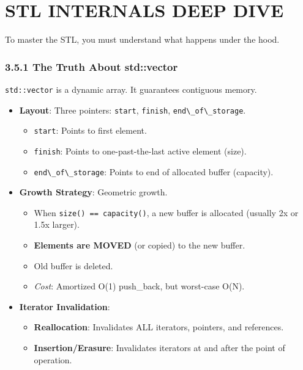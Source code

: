 \hypertarget{stl-internals-deep-dive}{%
\chapter{STL INTERNALS DEEP DIVE}\label{stl-internals-deep-dive}}

To master the STL, you must understand what happens under the hood.

\hypertarget{the-truth-about-stdvector}{%
\subsection{3.5.1 The Truth About
std::vector}\label{the-truth-about-stdvector}}

\passthrough{\lstinline!std::vector!} is a dynamic array. It guarantees
contiguous memory.

\begin{itemize}
\tightlist
\item
  \textbf{Layout}: Three pointers: \passthrough{\lstinline!start!},
  \passthrough{\lstinline!finish!},
  \passthrough{\lstinline!end\_of\_storage!}.

  \begin{itemize}
  \tightlist
  \item
    \passthrough{\lstinline!start!}: Points to first element.
  \item
    \passthrough{\lstinline!finish!}: Points to one-past-the-last active
    element (size).
  \item
    \passthrough{\lstinline!end\_of\_storage!}: Points to end of
    allocated buffer (capacity).
  \end{itemize}
\item
  \textbf{Growth Strategy}: Geometric growth.

  \begin{itemize}
  \tightlist
  \item
    When \passthrough{\lstinline!size() == capacity()!}, a new buffer is
    allocated (usually 2x or 1.5x larger).
  \item
    \textbf{Elements are MOVED} (or copied) to the new buffer.
  \item
    Old buffer is deleted.
  \item
    \emph{Cost}: Amortized O(1) push\_back, but worst-case O(N).
  \end{itemize}
\item
  \textbf{Iterator Invalidation}:

  \begin{itemize}
  \tightlist
  \item
    \textbf{Reallocation}: Invalidates ALL iterators, pointers, and
    references.
  \item
    \textbf{Insertion/Erasure}: Invalidates iterators at and after the
    point of operation.
  \end{itemize}
\end{itemize}

